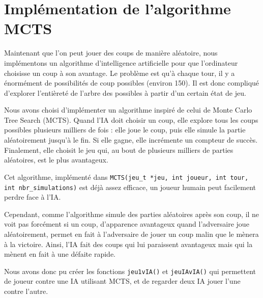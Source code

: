 \documentclass{article}
\begin{document}
\section{Implémentation de l'algorithme MCTS}

Maintenant que l'on peut jouer des coups de manière aléatoire, nous implémentons un algorithme d'intelligence artificielle pour que l'ordinateur choisisse un coup à son avantage. Le problème est qu'à chaque tour, il y a énormément de possibilités de coup possibles (environ 150). Il est donc compliqué d'explorer l'entièreté de l'arbre des possibles à partir d'un certain état de jeu.

Nous avons choisi d'implémenter un algorithme inspiré de celui de Monte Carlo Tree Search (MCTS). Quand l'IA doit choisir un coup, elle explore tous les coups possibles plusieurs milliers de fois : elle joue le coup, puis elle simule la partie aléatoirement jusqu'à le fin. Si elle gagne, elle incrémente un compteur de succès. Finalement, elle choisit le jeu qui, au bout de plusieurs milliers de parties aléatoires, est le plus avantageux.

Cet algorithme, implémenté dans {\tt MCTS(jeu\_t *jeu, int joueur, int tour, int nbr\_simulations)} est déjà assez efficace, un joueur humain peut facilement perdre face à l'IA.

Cependant, comme l'algorithme simule des parties aléatoires après son coup, il ne voit pas forcément si un coup, d'apparence avantageux quand l'adversaire joue aléatoirement, permet en fait à l'adversaire de jouer un coup malin que le mènera à la victoire. Ainsi, l'IA fait des coups qui lui paraissent avantageux mais qui la mènent en fait à une défaite rapide.

Nous avons donc pu créer les fonctions  {\tt jeu1vIA()} et {\tt jeuIAvIA()}
qui permettent de joueur contre une IA utilisant MCTS, et de regarder deux IA jouer l'une contre l'autre.
\end{document}
